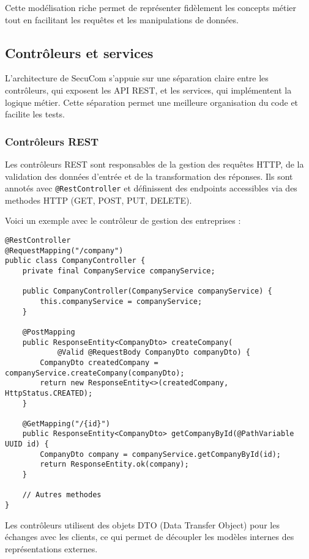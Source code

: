 Cette modélisation riche permet de représenter fidèlement les concepts métier tout en facilitant les requêtes et les manipulations de données.

\subsection{Contrôleurs et services}

L'architecture de SecuCom s'appuie sur une séparation claire entre les contrôleurs, qui exposent les API REST, et les services, qui implémentent la logique métier. Cette séparation permet une meilleure organisation du code et facilite les tests.

\subsubsection{Contrôleurs REST}

Les contrôleurs REST sont responsables de la gestion des requêtes HTTP, de la validation des données d'entrée et de la transformation des réponses. Ils sont annotés avec \texttt{@RestController} et définissent des endpoints accessibles via des methodes HTTP (GET, POST, PUT, DELETE).

Voici un exemple avec le contrôleur de gestion des entreprises :

\begin{lstlisting}
@RestController
@RequestMapping("/company")
public class CompanyController {
    private final CompanyService companyService;
    
    public CompanyController(CompanyService companyService) {
        this.companyService = companyService;
    }
    
    @PostMapping
    public ResponseEntity<CompanyDto> createCompany(
            @Valid @RequestBody CompanyDto companyDto) {
        CompanyDto createdCompany = companyService.createCompany(companyDto);
        return new ResponseEntity<>(createdCompany, HttpStatus.CREATED);
    }
    
    @GetMapping("/{id}")
    public ResponseEntity<CompanyDto> getCompanyById(@PathVariable UUID id) {
        CompanyDto company = companyService.getCompanyById(id);
        return ResponseEntity.ok(company);
    }
    
    // Autres methodes
}
\end{lstlisting}

Les contrôleurs utilisent des objets DTO (Data Transfer Object) pour les échanges avec les clients, ce qui permet de découpler les modèles internes des représentations externes.

